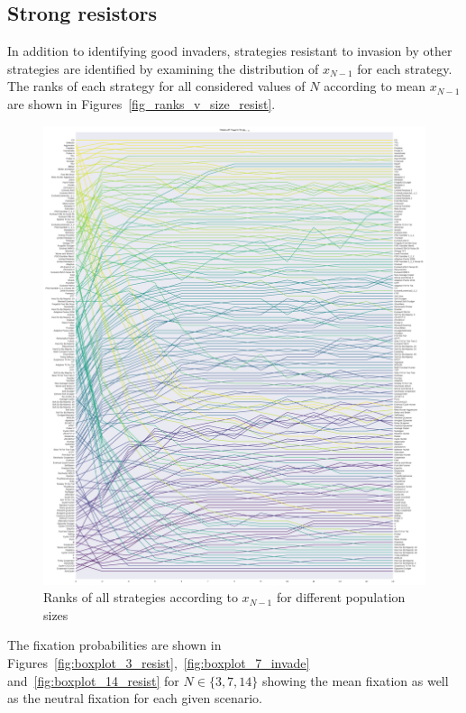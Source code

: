 \documentclass{article}
\begin{document}
\subsection{Strong resistors}\label{sec:strong_resistors}

In addition to identifying good invaders, strategies resistant to invasion by
other strategies are identified by examining the distribution of $x_{N-1}$ for
each strategy. The ranks of each strategy for all considered values of \(N\)
according to mean \(x_{N-1}\) are shown in
Figures~\ref{fig_ranks_v_size_resist}.

\begin{figure}[!hbtp]
    \centering
    \includegraphics[height=.9\textheight]{./img/average_rank_vs_population_size_resist.pdf}
    \caption{Ranks of all strategies according to \(x_{N-1}\) for different
    population sizes}
    \label{fig:ranks_v_size_resist}
\end{figure}

The fixation probabilities are shown in
Figures~\ref{fig:boxplot_3_resist},~\ref{fig:boxplot_7_invade}
and~\ref{fig:boxplot_14_resist} for \(N\in\{3, 7, 14\}\) showing the mean
fixation as well as the neutral fixation for each given scenario.
\end{document}
